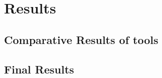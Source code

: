 
\chapter{Results}\label{chapter:results}


\section{Comparative Results of tools}
\section{Final Results}
